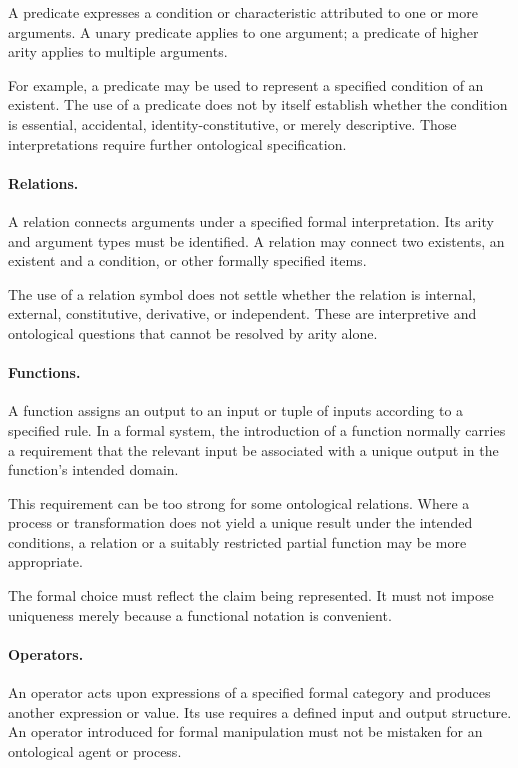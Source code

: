A predicate expresses a condition or
characteristic attributed to one or more
arguments. A unary predicate applies to
one argument; a predicate of higher arity
applies to multiple arguments.

For example, a predicate may be used
to represent a specified condition of
an existent. The use of a predicate
does not by itself establish whether
the condition is essential, accidental,
identity-constitutive, or merely descriptive.
Those interpretations require further
ontological specification.

\paragraph{Relations.}

A relation connects arguments under
a specified formal interpretation.
Its arity and argument types must be
identified. A relation may connect
two existents, an existent and a
condition, or other formally specified
items.

The use of a relation symbol does not
settle whether the relation is internal,
external, constitutive, derivative,
or independent. These are interpretive
and ontological questions that cannot
be resolved by arity alone.

\paragraph{Functions.}

A function assigns an output to an
input or tuple of inputs according
to a specified rule. In a formal
system, the introduction of a function
normally carries a requirement that
the relevant input be associated
with a unique output in the function's
intended domain.

This requirement can be too strong
for some ontological relations.
Where a process or transformation
does not yield a unique result under
the intended conditions, a relation
or a suitably restricted partial
function may be more appropriate.

The formal choice must reflect the
claim being represented. It must not
impose uniqueness merely because
a functional notation is convenient.

\paragraph{Operators.}

An operator acts upon expressions
of a specified formal category and
produces another expression or value.
Its use requires a defined input
and output structure. An operator
introduced for formal manipulation
must not be mistaken for an ontological
agent or process.

